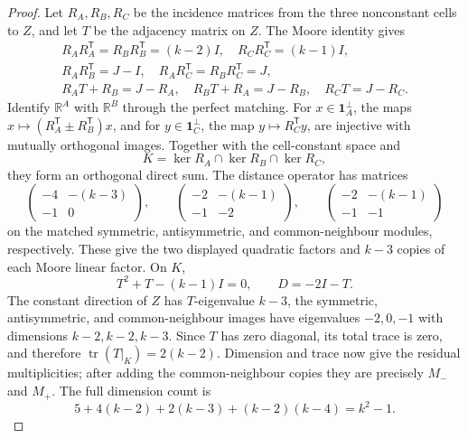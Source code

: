 \documentclass[a4paper,10pt,reqno]{amsart}
\theoremstyle{plain}
\theoremstyle{definition}
\theoremstyle{remark}
\newcommand{\one}{\mathbf 1}
\newcommand{\tr}{\operatorname{tr}}
\begin{document}
\begin{proof}
Let \(R_A,R_B,R_C\) be the incidence matrices from the three nonconstant
cells to \(Z\), and let \(T\) be the adjacency matrix on \(Z\).  The Moore
identity gives
\[
\begin{gathered}
R_AR_A^{\mathsf T}=R_BR_B^{\mathsf T}=(k-2)I,\quad
R_CR_C^{\mathsf T}=(k-1)I,\\
R_AR_B^{\mathsf T}=J-I,\quad
R_AR_C^{\mathsf T}=R_BR_C^{\mathsf T}=J,\\
R_AT+R_B=J-R_A,\quad R_BT+R_A=J-R_B,\quad R_CT=J-R_C.
\end{gathered}
\]
Identify \(\mathbb R^A\) with \(\mathbb R^B\) through the perfect matching.
For \(x\in\one_A^\perp\), the maps
\(x\mapsto(R_A^{\mathsf T}\pm R_B^{\mathsf T})x\), and for
\(y\in\one_C^\perp\), the map \(y\mapsto R_C^{\mathsf T}y\), are injective
with mutually orthogonal images.
Together with the cell-constant space and
\[
 K=\ker R_A\cap\ker R_B\cap\ker R_C,
\]
they form an orthogonal direct sum.  The distance operator has matrices
\[
 \begin{pmatrix}-4&-(k-3)\\-1&0\end{pmatrix},\qquad
 \begin{pmatrix}-2&-(k-1)\\-1&-2\end{pmatrix},\qquad
 \begin{pmatrix}-2&-(k-1)\\-1&-1\end{pmatrix}
\]
on the matched symmetric, antisymmetric, and common-neighbour modules,
respectively.  These give the two displayed quadratic factors and \(k-3\)
copies of each Moore linear factor.  On \(K\),
\[
 T^2+T-(k-1)I=0,
 \qquad D=-2I-T.
\]
The constant direction of \(Z\) has \(T\)-eigenvalue \(k-3\), the
symmetric, antisymmetric, and common-neighbour images have eigenvalues
\(-2,0,-1\) with dimensions \(k-2,k-2,k-3\).  Since \(T\) has zero
diagonal, its total trace is zero, and therefore
\(\tr(T|_K)=2(k-2)\).  Dimension and trace now give the residual
multiplicities; after adding the common-neighbour copies they are precisely
\(M_-\) and \(M_+\).  The full dimension count is
\[
 5+4(k-2)+2(k-3)+(k-2)(k-4)=k^2-1.
\]


\end{proof}
\end{document}
